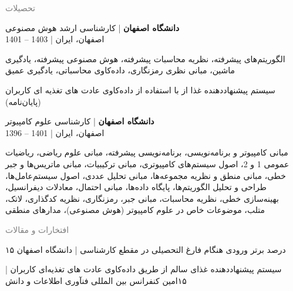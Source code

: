 \documentclass[a4paper]{deedy-persian} %
\begin{document}
\begin{minipage}[t]{0.62\textwidth} %
\textcolor{gray}{\huge {تحصیلات}}
\vspace{\topsep} %

\textbf{دانشگاه اصفهان} | کارشناسی ارشد هوش مصنوعی  \\
\vspace{\itemsep} 
1401 – 1403 | اصفهان، ایران
\vspace{\itemsep} 
\begin{tightitemize}
\item الگوریتم‌های پیشرفته، نظریه محاسبات پیشرفته، هوش مصنوعی پیشرفته، یادگیری ماشین، مبانی نظری رمزنگاری، داده‌کاوی محاسباتی، یادگیری عمیق
\item سیستم پیشنهاددهنده غذا از با استفاده از داده‌کاوی عادت های تغذیه ای کاربران (پایان‌نامه)
\end{tightitemize}
\sectionspace %
\textbf{دانشگاه اصفهان} | کارشناسی علوم کامپیوتر  \\
\vspace{\itemsep} %
1396 – 1401 | اصفهان، ایران
\begin{tightitemize}
\item مبانی کامپیوتر و برنامه‌نویسی، برنامه‌نویسی پیشرفته، مبانی علوم ریاضی، ریاضیات عمومی 1 و 2، اصول سیستم‌های کامپیوتری، مبانی ترکیبیات، مبانی ماتریس‌ها و جبر خطی، مبانی منطق و نظریه مجموعه‌ها، مبانی تحلیل عددی، اصول سیستم‌عامل‌ها، طراحی و تحلیل الگوریتم‌ها، پایگاه داده‌ها، مبانی احتمال، معادلات دیفرانسیل، بهینه‌سازی خطی، نظریه محاسبات، مبانی جبر، رمزنگاری، نظریه کدگذاری، لاتک، متلب، موضوعات خاص در علوم کامپیوتر (هوش مصنوعی)، مدارهای منطقی
\end{tightitemize}
\sectionspace %
\vspace{\topsep}
\textcolor{gray}{\huge {افتخارات و مقالات}}
\vspace{\itemsep} %
\begin{tightitemize}
\item ۱۵ درصد برتر ورودی هنگام فارغ التحصیلی در مقطع کارشناسی | دانشگاه اصفهان
\item سیستم پیشنهاددهنده غذای سالم از طریق داده‌کاوی عادت های تغذیه‌ای کاربران | ۱۵‌امین کنفرانس بین المللی فنآوری اطلاعات و دانش 
\end{tightitemize}

\end{minipage}
\end{document}
